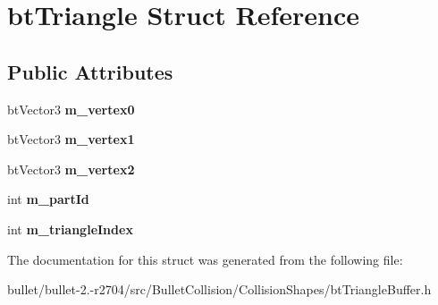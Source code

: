 \hypertarget{structbt_triangle}{\section{bt\+Triangle Struct Reference}
\label{structbt_triangle}
}
\subsection*{Public Attributes}
\begin{DoxyCompactItemize}
\item 
\hypertarget{structbt_triangle_a42fbabffa2712410a3415b3ad36e87f0}{bt\+Vector3 {\bfseries m\+\_\+vertex0}}\label{structbt_triangle_a42fbabffa2712410a3415b3ad36e87f0}

\item 
\hypertarget{structbt_triangle_aba504f74cd6283a0fae97ebbf4404952}{bt\+Vector3 {\bfseries m\+\_\+vertex1}}\label{structbt_triangle_aba504f74cd6283a0fae97ebbf4404952}

\item 
\hypertarget{structbt_triangle_a7e26ce3c98ef6387d116794843a5ddf7}{bt\+Vector3 {\bfseries m\+\_\+vertex2}}\label{structbt_triangle_a7e26ce3c98ef6387d116794843a5ddf7}

\item 
\hypertarget{structbt_triangle_af5554c2e94da692fcabff95d54cf2134}{int {\bfseries m\+\_\+part\+Id}}\label{structbt_triangle_af5554c2e94da692fcabff95d54cf2134}

\item 
\hypertarget{structbt_triangle_ad4507b034ae276b0d7ba0bb79489bbec}{int {\bfseries m\+\_\+triangle\+Index}}\label{structbt_triangle_ad4507b034ae276b0d7ba0bb79489bbec}

\end{DoxyCompactItemize}


The documentation for this struct was generated from the following file\+:\begin{DoxyCompactItemize}
\item 
bullet/bullet-\/2.-\/r2704/src/\+Bullet\+Collision/\+Collision\+Shapes/bt\+Triangle\+Buffer.\+h\end{DoxyCompactItemize}
